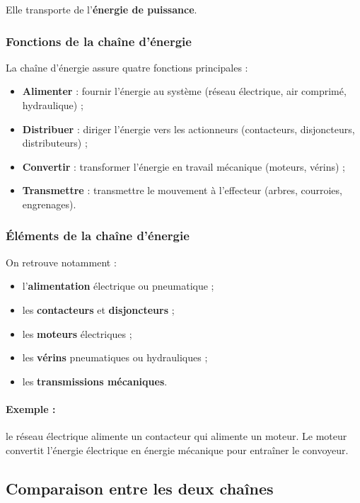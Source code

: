 Elle transporte de l'\textbf{énergie de puissance}.

\subsubsection{Fonctions de la chaîne d'énergie}

La chaîne d'énergie assure quatre fonctions principales :

\begin{itemize}
    \item \textbf{Alimenter} : fournir l'énergie au système (réseau électrique, air comprimé, hydraulique) ;
    \item \textbf{Distribuer} : diriger l'énergie vers les actionneurs (contacteurs, disjoncteurs, distributeurs) ;
    \item \textbf{Convertir} : transformer l'énergie en travail mécanique (moteurs, vérins) ;
    \item \textbf{Transmettre} : transmettre le mouvement à l'effecteur (arbres, courroies, engrenages).
\end{itemize}

\subsubsection{Éléments de la chaîne d'énergie}

On retrouve notamment :

\begin{itemize}
    \item l'\textbf{alimentation} électrique ou pneumatique ;
    \item les \textbf{contacteurs} et \textbf{disjoncteurs} ;
    \item les \textbf{moteurs} électriques ;
    \item les \textbf{vérins} pneumatiques ou hydrauliques ;
    \item les \textbf{transmissions mécaniques}.
\end{itemize}

\paragraph{Exemple :} le réseau électrique alimente un contacteur qui alimente un moteur. Le moteur convertit l'énergie électrique en énergie mécanique pour entraîner le convoyeur.

\subsection{Comparaison entre les deux chaînes}

